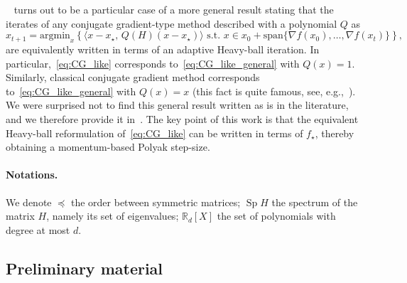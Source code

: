 \documentclass{article}
\def\Sp{\operatorname{Sp}}
\newcommand{\Span}{\mathrm{span}}
\newcommand{\xs}{x_\star}
\begin{document}
    ~ turns out to be a particular case of a more general result stating that the iterates of any conjugate gradient-type method described with a polynomial $Q$ as
    \begin{equation}\label{eq:CG_like_general}
        x_{t+1} = \mathrm{argmin}_x \left\{ \langle x-\xs,\,  Q(H) (x-\xs)\rangle \text{ s.t. } x \in x_0 + \Span \{ \nabla f(x_0), \ldots, \nabla f(x_t)\} \right\},\tag{Q-minimization}
    \end{equation}
    are equivalently written in terms of an adaptive Heavy-ball iteration.
    In particular,~\cref{eq:CG_like} corresponds to~\cref{eq:CG_like_general} with $Q(x)=1$.
    Similarly, classical conjugate gradient method corresponds to~\cref{eq:CG_like_general} with $Q(x)=x$ (this fact is quite famous,
    see, e.g.,~\cite{nocedal1999numerical}).
    We were surprised not to find this general result written as is in the literature, and we therefore provide it in~.
    The key point of this work is that the equivalent Heavy-ball reformulation of~\cref{eq:CG_like} can be written in terms of $f_\star$,
    thereby obtaining a momentum-based Polyak step-size.

\paragraph{Notations.} We denote $\preccurlyeq$ the order between symmetric matrices; $\Sp{H}$ the spectrum of the matrix $H$, namely its set of eigenvalues; $\mathbb{R}_d[X]$ the set of polynomials with degree at most $d$.

\subsection{Preliminary material}\label{subsec:preliminary-material}
\end{document}
